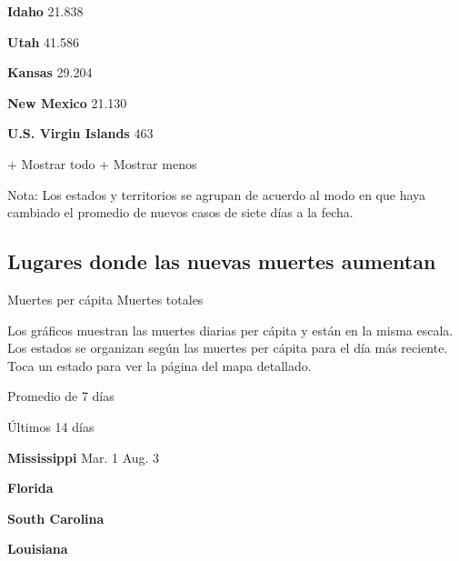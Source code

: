 \textbf{Idaho} 21.838

\href{https://www.nytimes3xbfgragh.onion/interactive/2020/us/utah-coronavirus-cases.html}{}

\textbf{Utah} 41.586

\href{https://www.nytimes3xbfgragh.onion/interactive/2020/us/kansas-coronavirus-cases.html}{}

\textbf{Kansas} 29.204

\href{https://www.nytimes3xbfgragh.onion/interactive/2020/us/new-mexico-coronavirus-cases.html}{}

\textbf{New Mexico} 21.130

\textbf{U.S. Virgin Islands} 463

+ Mostrar todo + Mostrar menos

Nota: Los estados y territorios se agrupan de acuerdo al modo en que
haya cambiado el promedio de nuevos casos de siete días a la fecha.

\hypertarget{lugares-donde-las-nuevas-muertes-aumentan}{%
\subsection{Lugares donde las nuevas muertes
aumentan}\label{lugares-donde-las-nuevas-muertes-aumentan}}

Muertes per cápita Muertes totales

Los gráficos muestran las muertes diarias per cápita y están en la misma
escala. Los estados se organizan según las muertes per cápita para el
día más reciente. Toca un estado para ver la página del mapa detallado.

\href{https://www.nytimes3xbfgragh.onion/interactive/2020/us/mississippi-coronavirus-cases.html}{}

Promedio de 7 días

Últimos 14 días

\textbf{Mississippi} Mar. 1 Aug. 3

\href{https://www.nytimes3xbfgragh.onion/interactive/2020/us/florida-coronavirus-cases.html}{}

\textbf{Florida}

\href{https://www.nytimes3xbfgragh.onion/interactive/2020/us/south-carolina-coronavirus-cases.html}{}

\textbf{South Carolina}

\href{https://www.nytimes3xbfgragh.onion/interactive/2020/us/louisiana-coronavirus-cases.html}{}

\textbf{Louisiana}

